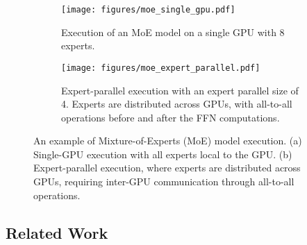 \begin{figure}[h!]
    \centering
    \begin{subfigure}[t]{0.36\linewidth}
        \centering
        \texttt{[image: figures/moe\_single\_gpu.pdf]}
        \caption{Execution of an MoE model on a single GPU with 8 experts. }
        \label{fig:moe-single-gpu}
    \end{subfigure}
    \hfill
    \begin{subfigure}[t]{0.54\linewidth}
        \centering
        \texttt{[image: figures/moe\_expert\_parallel.pdf]}
        \caption{Expert-parallel execution with an expert parallel size of 4. Experts are distributed across GPUs, with all-to-all operations before and after the FFN computations.}
        \label{fig:moe-expert-parallel}
    \end{subfigure}
    \vspace{-0.8em}
    \caption{An example of Mixture-of-Experts (MoE) model execution. (a) Single-GPU execution with all experts local to the GPU. (b) Expert-parallel execution, where experts are distributed across GPUs, requiring inter-GPU communication through all-to-all operations.}
    \label{fig:background-ep}
\end{figure}
\vspace{-1em}



\subsection{Related Work}


